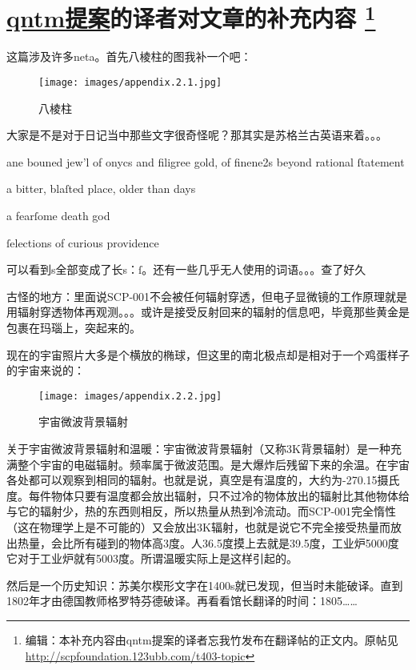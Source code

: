 \chapter[qntm提案的译者对文章的补充内容]{
	\hyperref[chap:SCP.001.the.lock]{qntm提案}的译者对文章的补充内容
	\protect\footnote{
		编辑\QIS ：本补充内容由qntm提案的译者忘我竹发布在翻译帖的正文内。原帖见 \url{http://scpfoundation.123ubb.com/t403-topic}
	}
}

\label{chap:qntm.translator.append}

这篇涉及许多neta。首先八棱柱的图我补一个吧：

\begin{figure}[H]
	\centering
	\texttt{[image: images/appendix.2.1.jpg]}
	\caption*{八棱柱}
\end{figure}

大家是不是对于日记当中那些文字很奇怪呢？那其实是苏格兰古英语来着。。。

ane bouned jew'l of onycs and filigree gold, of finene2s beyond rational ſtatement

a bitter, blaſted place, older than days

a fearſome death god

ſelections of curious providence

可以看到s全部变成了长s：ſ。还有一些几乎无人使用的词语。。。查了好久

古怪的地方：里面说SCP-001不会被任何辐射穿透，但电子显微镜的工作原理就是用辐射穿透物体再观测。。。或许是接受反射回来的辐射的信息吧，毕竟那些黄金是包裹在玛瑙上，突起来的。

现在的宇宙照片大多是个横放的椭球，但这里的南北极点却是相对于一个鸡蛋样子的宇宙来说的：

\begin{figure}[H]
	\centering
	\texttt{[image: images/appendix.2.2.jpg]}
	\caption*{宇宙微波背景辐射}
\end{figure}

关于宇宙微波背景辐射和温暖：宇宙微波背景辐射（又称3K背景辐射）是一种充满整个宇宙的电磁辐射。频率属于微波范围。是大爆炸后残留下来的余温。在宇宙各处都可以观察到相同的辐射。也就是说，真空是有温度的，大约为-270.15摄氏度。每件物体只要有温度都会放出辐射，只不过冷的物体放出的辐射比其他物体给与它的辐射少，热的东西则相反，所以热量从热到冷流动。而SCP-001完全惰性（这在物理学上是不可能的）又会放出3K辐射，也就是说它不完全接受热量而放出热量，会比所有碰到的物体高3度。人36.5度摸上去就是39.5度，工业炉5000度它对于工业炉就有5003度。所谓温暖实际上是这样引起的。

然后是一个历史知识：苏美尔楔形文字在1400s就已发现，但当时未能破译。直到1802年才由德国教师格罗特芬德破译。再看看馆长翻译的时间：1805……

